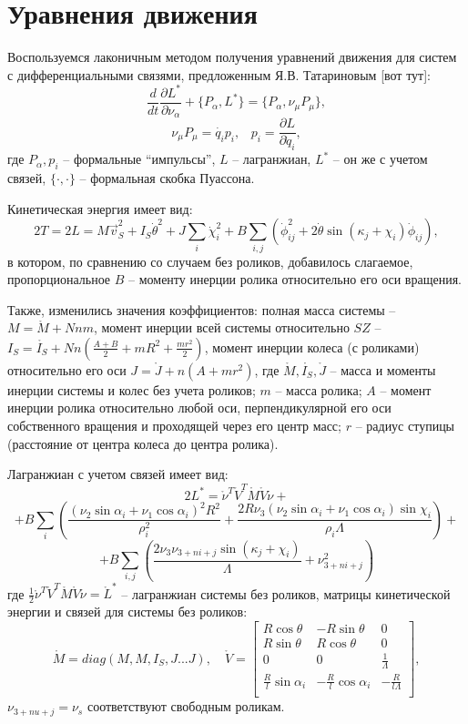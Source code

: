 
\section{Уравнения движения}

Воспользуемся лаконичным методом получения уравнений движения для систем с дифференциальными связями, предложенным Я.В. Татариновым [вот тут]:
$$ \frac{d}{dt}\frac{\partial L^{*}}{\partial \nu_\alpha}  + \{P_\alpha, L^{*}\} = \{P_\alpha, \nu_\mu P_\mu\}, $$
$$ \nu_\mu P_\mu = \dot{q_i} p_i, \hspace{10pt} p_i = \frac{\partial L}{\partial \dot{q}_i},$$
где $P_\alpha, p_i$ -- формальные ``импульсы'', $L$ -- лагранжиан, $L^*$ -- он же с учетом связей, $\{\cdot, \cdot\}$ -- формальная скобка Пуассона.

Кинетическая энергия имеет вид:
$$ 2T = 2L = M\vec{v}_S^2 + I_S\dot{\theta}^2 + J\sum_i\dot{\chi}_i^2 + B\sum_{i,j}(\dot{\phi}_{ij}^2 + 2\dot{\theta}\sin(\kappa_j + \chi_i)\dot{\phi}_{ij}),$$
в котором, по сравнению со случаем без роликов, добавилось слагаемое, пропорциональное $B$ -- моменту инерции ролика относительно его оси вращения.

Также, изменились значения коэффициентов: полная масса системы -- $M = \mathring{M} + Nnm$, момент инерции всей системы относительно $SZ$ -- $I_S = \mathring{I_S} + Nn(\frac{A+B}{2} + mR^2 + \frac{mr^2}{2})$, момент инерции колеса (с роликами) относительно его оси $J = \mathring{J} + n(A + mr^2)$, где $\mathring{M}, \mathring{I_S}, \mathring{J}$ -- масса и моменты инерции системы и колес без учета роликов; $m$ -- масса ролика; $A$ -- момент инерции ролика относительно любой оси, перпендикулярной его оси собственного вращения и проходящей через его центр масс; $r$ -- радиус ступицы (расстояние от центра колеса до центра ролика).

Лагранжиан с учетом связей имеет вид:
$$ 2L^{*} = \mathring{\nu}^T \mathring{V}^T \mathring{M} \mathring{V} \mathring{\nu} + $$
$$ + B\sum_{i}(
	\frac{(\nu_2\sin\alpha_i+\nu_1\cos\alpha_i)^2R^2}
	{\rho_i^2} +
	\frac{2R\nu_3(\nu_2\sin\alpha_i+\nu_1\cos\alpha_i)\sin\chi_i}
	{\rho_i\Lambda}
) + $$
$$+ B\sum_{i,j}(
	\frac{2\nu_3\nu_{3+ni+j}\sin(\kappa_j+\chi_i)}
	{\Lambda}
	+
	\nu_{3+ni+j}^2
)
$$
где $\frac{1}{2}\mathring{\nu}^T \mathring{V}^T \mathring{M} \mathring{V} \mathring{\nu} = \mathring{L}^{*}$ -- лагранжиан системы без роликов, матрицы кинетической энергии и связей для системы без роликов:
$$
\mathring{M} = diag(M, M, I_S, J...J),
\quad
\mathring{V} = \begin{bmatrix}
    R\cos\theta & -R\sin\theta & 0 \\
    R\sin\theta & R\cos\theta  & 0 \\
    0           & 0            & \frac{1}{\Lambda} \\
    \frac{R}{l}\sin\alpha_i & -\frac{R}{l}\cos\alpha_i & -\frac{R}{l\Lambda} \\
\end{bmatrix},
$$
$\nu_{3+nu+j} = \nu_s$ соответствуют свободным роликам.

